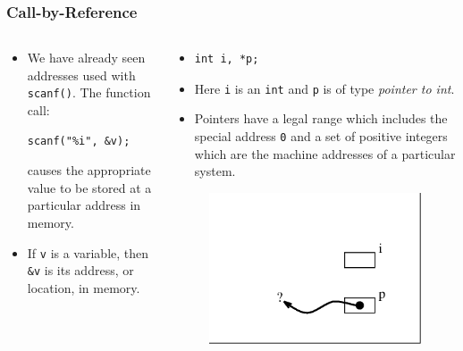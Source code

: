 \begin{frame}[fragile]
\frametitle{Call-by-Reference}
\begin{columns}[T]

\begin{column}{0.45\textwidth}
\begin{itemize}[<+->]
\item We have already seen addresses used with \verb^scanf()^.
The function call:
\begin{verbatim}
scanf("%i", &v);
\end{verbatim}
causes the appropriate value to be stored at a particular
address in memory.
\item If \verb^v^ is  a variable, then \verb^&v^ is its
address, or location, in memory.
\end{itemize}
\end{column}

\pause
\begin{column}{0.45\textwidth}
\begin{itemize}[<+->]
\item
\begin{verbatim}
int i, *p;
\end{verbatim}
\item Here \verb^i^ is an \verb^int^ and \verb^p^ is of type
{\it pointer to int}.
\item Pointers have a legal range which
includes the special address \verb^0^ and a set of positive
integers which are the machine addresses of a particular
system.
\end{itemize}
\begin{center}
\begin{figure}[h]
\centerline{
\includegraphics[scale=0.40]{../Figs/point8_1.eps}
}
\end{figure}
\end{center}
\end{column}

\end{columns}
\end{frame}

